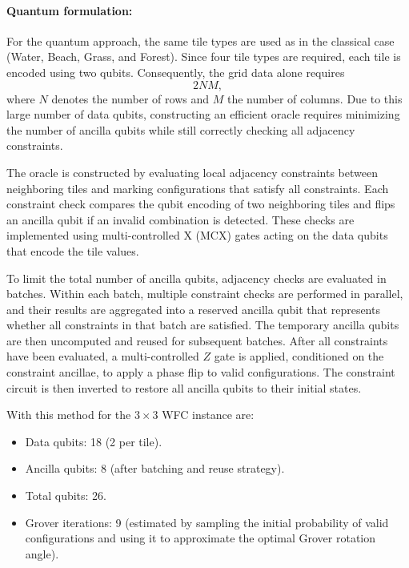 \paragraph{Quantum formulation:}

For the quantum approach, the same tile types are used as in the classical case (Water, Beach, Grass, and Forest). Since four tile types are required, each tile is encoded using two qubits. Consequently, the grid data alone requires
\[
2NM,
\]
where $N$ denotes the number of rows and $M$ the number of columns. Due to this large number of data qubits, constructing an efficient oracle requires minimizing the number of ancilla qubits while still correctly checking all adjacency constraints.

\vspace{1em}
\noindent
The oracle is constructed by evaluating local adjacency constraints between neighboring tiles and marking configurations that satisfy all constraints. Each constraint check compares the qubit encoding of two neighboring tiles and flips an ancilla qubit if an invalid combination is detected. These checks are implemented using multi-controlled X (MCX) gates acting on the data qubits that encode the tile values.

\vspace{1em}
\noindent
To limit the total number of ancilla qubits, adjacency checks are evaluated in batches. Within each batch, multiple constraint checks are performed in parallel, and their results are aggregated into a reserved ancilla qubit that represents whether all constraints in that batch are satisfied. The temporary ancilla qubits are then uncomputed and reused for subsequent batches. After all constraints have been evaluated, a multi-controlled $Z$ gate is applied, conditioned on the constraint ancillae, to apply a phase flip to valid configurations. The constraint circuit is then inverted to restore all ancilla qubits to their initial states.

\vspace{1em}
\noindent
With this method for the \(3\times 3\) WFC instance are:
\begin{itemize}
  \item Data qubits: 18 (2 per tile).
  \item Ancilla qubits: 8 (after batching and reuse strategy).
  \item Total qubits: 26.
  \item Grover iterations: 9 (estimated by sampling the initial probability of valid configurations and using it to approximate the optimal Grover rotation angle).
\end{itemize}

